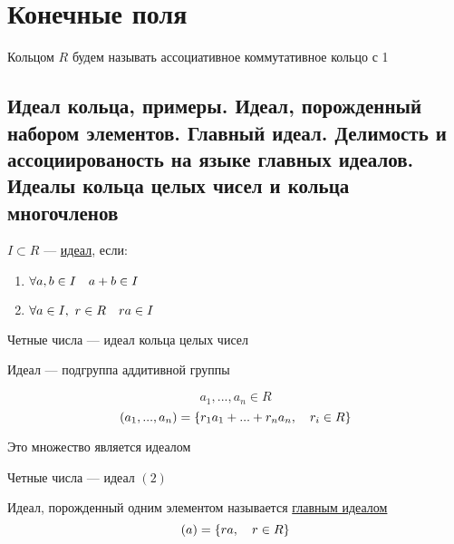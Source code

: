 \documentclass[main.tex]{subfiles}
\begin{document}
    \newpage
    \section{Конечные поля}
    Кольцом $R$ будем называть ассоциативное коммутативное кольцо с 1
    \subsection{Идеал кольца, примеры. Идеал, порожденный набором элементов. Главный идеал. Делимость и ассоциированость на языке главных идеалов. Идеалы кольца целых чисел и кольца многочленов}

    \begin{definition}
        $I \subset R$ --- \ul{идеал}, если:
        \begin{enumerate}
            \item $\forall a,b \in I \quad a + b \in I$
            \item $\forall a \in I,\ r \in R \quad ra \in I$
        \end{enumerate}
    \end{definition}

    \begin{example}
        Четные числа --- идеал кольца целых чисел
    \end{example}

    \begin{remark}

        Идеал --- подгруппа аддитивной группы
    \end{remark}

    \begin{Definition}[конструкция]
        \[a_1,..., a_n \in R\]
        \[(a_1,...,a_n) = \{ r_1 a_1 + ... + r_n a_n,\quad r_i \in R\} \]
    \end{Definition}

    \begin{utv}
        Это множество является идеалом
    \end{utv}

    \begin{example}
        Четные числа --- идеал $(2)$
    \end{example}

    \begin{definition}
        Идеал, порожденный одним элементом называется \ul{главным идеалом}
        \[(a) = \{ ra,\quad r \in R\}\]
    \end{definition}
\end{document}
